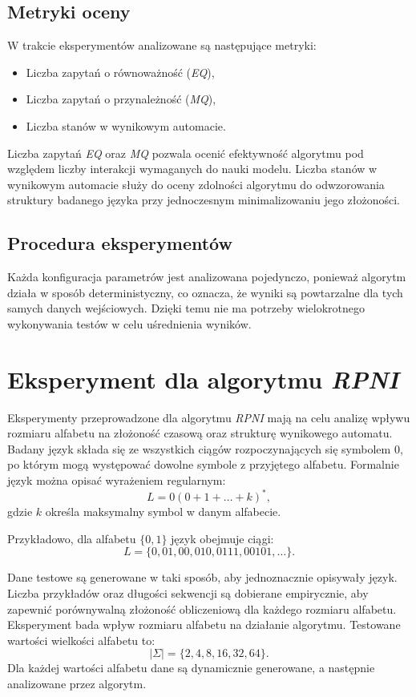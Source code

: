 \subsection{Metryki oceny}  
W trakcie eksperymentów analizowane są następujące metryki:  
\begin{itemize}  
    \item Liczba zapytań o równoważność (\textit{EQ}),  
    \item Liczba zapytań o przynależność (\textit{MQ}),  
    \item Liczba stanów w wynikowym automacie.
\end{itemize}  

Liczba zapytań \textit{EQ} oraz \textit{MQ} pozwala ocenić efektywność algorytmu pod względem liczby interakcji wymaganych do nauki modelu. Liczba stanów w wynikowym automacie służy do oceny zdolności algorytmu do odwzorowania struktury badanego języka przy jednoczesnym minimalizowaniu jego złożoności.  

\subsection{Procedura eksperymentów}  
Każda konfiguracja parametrów jest analizowana pojedynczo, ponieważ algorytm działa w sposób deterministyczny, co oznacza, że wyniki są powtarzalne dla tych samych danych wejściowych. Dzięki temu nie ma potrzeby wielokrotnego wykonywania testów w celu uśrednienia wyników.  


\section{Eksperyment dla algorytmu \textit{RPNI}}  
Eksperymenty przeprowadzone dla algorytmu \textit{RPNI} mają na celu analizę wpływu rozmiaru alfabetu na złożoność czasową oraz strukturę wynikowego automatu. Badany język składa się ze wszystkich ciągów rozpoczynających się symbolem \( 0 \), po którym mogą występować dowolne symbole z przyjętego alfabetu. Formalnie język można opisać wyrażeniem regularnym:  
\[
L = 0(0 + 1 + \ldots + k)^*,
\]  
gdzie \( k \) określa maksymalny symbol w danym alfabecie.  

Przykładowo, dla alfabetu \(\{0, 1\}\) język obejmuje ciągi:  
\[
L = \{0, 01, 00, 010, 0111, 00101, \ldots \}.
\]  

Dane testowe są generowane w taki sposób, aby jednoznacznie opisywały język. Liczba przykładów oraz długości sekwencji są dobierane empirycznie, aby zapewnić porównywalną złożoność obliczeniową dla każdego rozmiaru alfabetu. Eksperyment bada wpływ rozmiaru alfabetu na działanie algorytmu. Testowane wartości wielkości alfabetu to:  
\[
|\Sigma| = \{2, 4, 8, 16, 32, 64\}.
\]  
Dla każdej wartości alfabetu dane są dynamicznie generowane, a następnie analizowane przez algorytm.  
